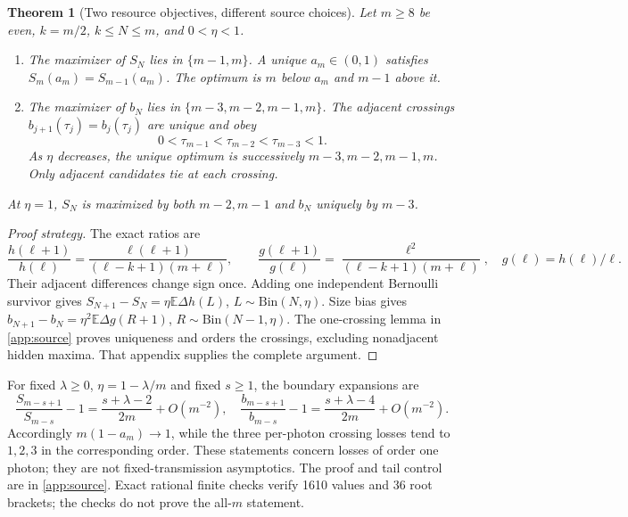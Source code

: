 \documentclass[11pt,a4paper]{article}
\newtheorem{theorem}{Theorem}
\theoremstyle{remark}\newtheorem{remark}[theorem]{Remark}
\newcommand{\E}{\mathbb E}
\providecommand{\SourceProbabilityCount}{1610}
\providecommand{\SourceBracketCount}{36}
\begin{document}
\begin{theorem}[Two resource objectives, different source choices]\label{thm:source}
Let $m\ge8$ be even, $k=m/2$, $k\le N\le m$, and $0<\eta<1$.
\begin{enumerate}
\item The maximizer of $S_N$ lies in $\{m-1,m\}$. A unique $a_m\in(0,1)$ satisfies $S_m(a_m)=S_{m-1}(a_m)$. The optimum is $m$ below $a_m$ and $m-1$ above it.
\item The maximizer of $b_N$ lies in $\{m-3,m-2,m-1,m\}$. The adjacent crossings $b_{j+1}(\tau_j)=b_j(\tau_j)$ are unique and obey
\begin{equation}
 0<\tau_{m-1}<\tau_{m-2}<\tau_{m-3}<1.
\end{equation}
As $\eta$ decreases, the unique optimum is successively $m-3,m-2,m-1,m$. Only adjacent candidates tie at each crossing.
\end{enumerate}
At $\eta=1$, $S_N$ is maximized by both $m-2,m-1$ and $b_N$ uniquely by $m-3$.
\end{theorem}
\begin{proof}[Proof strategy]
The exact ratios are
\begin{equation}
 \frac{h(\ell+1)}{h(\ell)}=\frac{\ell(\ell+1)}{(\ell-k+1)(m+\ell)},\qquad
 \frac{g(\ell+1)}{g(\ell)}=\frac{\ell^2}{(\ell-k+1)(m+\ell)},\quad g(\ell)=h(\ell)/\ell.
\end{equation}
Their adjacent differences change sign once. Adding one independent Bernoulli survivor gives $S_{N+1}-S_N=\eta\E\Delta h(L)$, $L\sim\mathrm{Bin}(N,\eta)$. Size bias gives $b_{N+1}-b_N=\eta^2\E\Delta g(R+1)$, $R\sim\mathrm{Bin}(N-1,\eta)$. The one-crossing lemma in \cref{app:source} proves uniqueness and orders the crossings, excluding nonadjacent hidden maxima. That appendix supplies the complete argument.
\end{proof}

For fixed $\lambda\ge0$, $\eta=1-\lambda/m$ and fixed $s\ge1$, the boundary expansions are
\begin{equation}
 \frac{S_{m-s+1}}{S_{m-s}}-1=\frac{s+\lambda-2}{2m}+O(m^{-2}),\quad
 \frac{b_{m-s+1}}{b_{m-s}}-1=\frac{s+\lambda-4}{2m}+O(m^{-2}).\label{eq:boundary}
\end{equation}
Accordingly $m(1-a_m)\to1$, while the three per-photon crossing losses tend to $1,2,3$ in the corresponding order. These statements concern losses of order one photon; they are not fixed-transmission asymptotics. The proof and tail control are in \cref{app:source}. Exact rational finite checks verify \SourceProbabilityCount{} values and \SourceBracketCount{} root brackets; the checks do not prove the all-$m$ statement.
\end{document}

